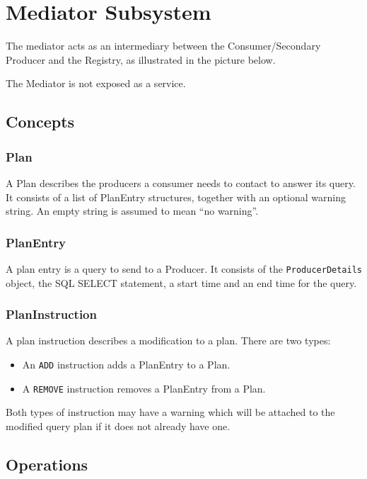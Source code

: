 \section{Mediator Subsystem}
\label{sec:mediator}

The mediator acts as an intermediary between the Consumer/Secondary Producer and the Registry,
as illustrated in the picture below.


The Mediator is not  exposed as a service.

\subsection{Concepts}
\subsubsection*{Plan}

A Plan describes the producers a consumer needs to contact to answer its query. It
consists of a list of PlanEntry structures, together with an optional warning string.
An empty string is assumed to mean ``no warning''.

\subsubsection*{PlanEntry}

A plan entry is a query to send to a Producer. It consists of the \texttt{ProducerDetails} object,
the SQL SELECT statement, a start time and an end time for the query.

\subsubsection*{PlanInstruction}

A plan instruction describes a modification to a plan. There are two types:

\begin{itemize}
\item An \texttt{ADD} instruction adds a PlanEntry to a Plan.
\item A \texttt{REMOVE} instruction removes a PlanEntry from a Plan.
\end{itemize}

Both types of instruction may have a warning which will be attached to the
modified query plan if it does not already have one.

\subsection{Operations}
